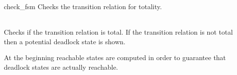 \begin{nusmvCommand}{check\_fsm} {Checks the transition relation for totality.}

\\

Checks if the transition relation is total. If the transition relation
is not total then a potential deadlock state is shown.

\begin{cmdOpt}

            

\end{cmdOpt}
At the beginning reachable states are computed in order to guarantee
that deadlock states are actually reachable.

\end{nusmvCommand}
